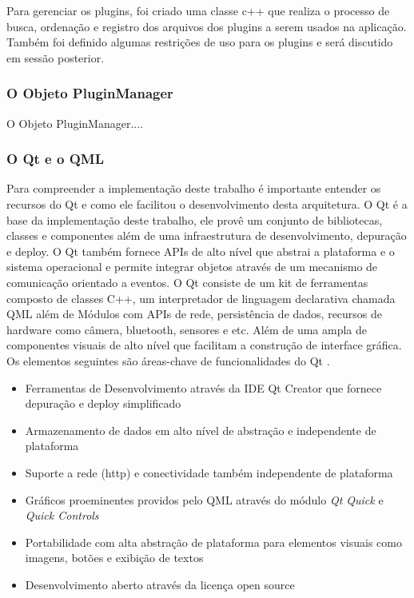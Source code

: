 Para gerenciar os plugins, foi criado uma classe c++ que realiza o processo de busca, ordenação e registro dos arquivos dos plugins a serem usados na aplicação. Também foi definido algumas restrições de uso para os plugins e será discutido em sessão posterior.


\subsubsection{O Objeto PluginManager}\label{sec:solucao-desenvolvida}
O Objeto PluginManager....


\subsubsection{O Qt e o QML}\label{sec:solucao-desenvolvida}
Para compreender a implementação deste trabalho é importante entender os recursos do Qt e como ele facilitou o desenvolvimento desta arquitetura. O Qt é a base da implementação deste trabalho, ele provê um conjunto de bibliotecas, classes e componentes além de uma infraestrutura de desenvolvimento, depuração e deploy. O Qt também fornece APIs de alto nível que abstrai a plataforma e o sistema operacional e permite integrar objetos através de um mecanismo de comunicação orientado a eventos. O Qt consiste de um kit de ferramentas composto de classes C++, um interpretador de linguagem declarativa chamada QML além de Módulos com APIs de rede, persistência de dados, recursos de hardware como câmera, bluetooth, sensores e etc. Além de uma ampla de componentes visuais de alto nível que facilitam a construção de interface gráfica. Os elementos seguintes são áreas-chave de funcionalidades do Qt \cite{qt_overviews}.

\begin{itemize}
	\item Ferramentas de Desenvolvimento através da IDE Qt Creator que fornece depuração e deploy simplificado
	\item Armazenamento de dados em alto nível de abstração e independente de plataforma
	\item Suporte a rede (http) e conectividade também independente de plataforma
	\item Gráficos proeminentes providos pelo QML através do módulo \textit{Qt Quick} e \textit{Quick Controls}
	\item Portabilidade com alta abstração de plataforma para elementos visuais como imagens, botões e exibição de textos
	\item Desenvolvimento aberto através da licença open source
\end{itemize}

